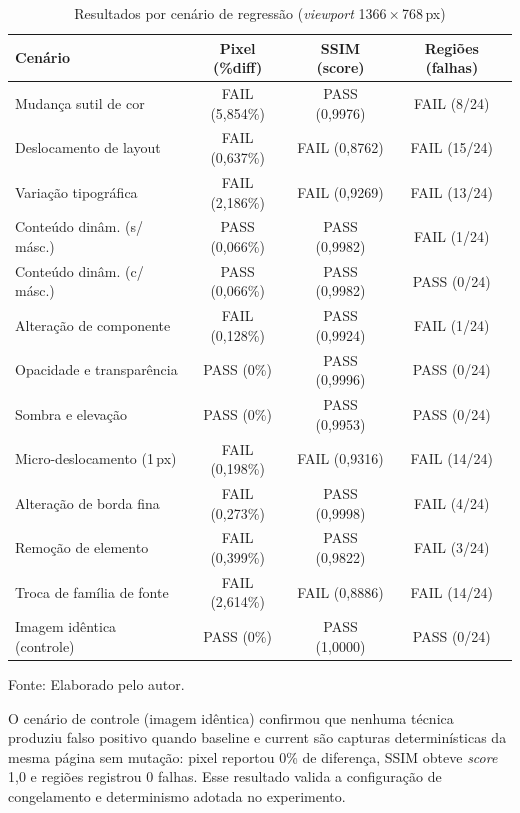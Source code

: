 \documentclass{UNESC}
\begin{document}
\begin{table}[H]
\centering
\caption{Resultados por cenário de regressão (\emph{viewport} 1366\,$\times$\,768\,px)}
\label{tab:cenarios}
\small
\setlength{\tabcolsep}{5pt}
\renewcommand{\arraystretch}{1.2}
\begin{tabular}{|l|c|c|c|}
\hline
\textbf{Cenário} & \textbf{Pixel (\%diff)} & \textbf{SSIM (score)} & \textbf{Regiões (falhas)} \\
\hline
Mudança sutil de cor       & FAIL (5,854\%) & PASS (0,9976) & FAIL (8/24) \\
Deslocamento de layout     & FAIL (0,637\%) & FAIL (0,8762) & FAIL (15/24) \\
Variação tipográfica       & FAIL (2,186\%) & FAIL (0,9269) & FAIL (13/24) \\
Conteúdo dinâm. (s/ másc.) & PASS (0,066\%) & PASS (0,9982) & FAIL (1/24) \\
Conteúdo dinâm. (c/ másc.) & PASS (0,066\%) & PASS (0,9982) & PASS (0/24) \\
Alteração de componente    & FAIL (0,128\%) & PASS (0,9924) & FAIL (1/24) \\
Opacidade e transparência  & PASS (0\%)     & PASS (0,9996) & PASS (0/24) \\
Sombra e elevação          & PASS (0\%)     & PASS (0,9953) & PASS (0/24) \\
Micro-deslocamento (1\,px) & FAIL (0,198\%) & FAIL (0,9316) & FAIL (14/24) \\
Alteração de borda fina    & FAIL (0,273\%) & PASS (0,9998) & FAIL (4/24) \\
Remoção de elemento        & FAIL (0,399\%) & PASS (0,9822) & FAIL (3/24) \\
Troca de família de fonte  & FAIL (2,614\%) & FAIL (0,8886) & FAIL (14/24) \\
Imagem idêntica (controle) & PASS (0\%)     & PASS (1,0000) & PASS (0/24) \\
\hline
\end{tabular}
\vspace{-0.2cm}
\hspace{1cm}\footnotesize Fonte: Elaborado pelo autor.
\end{table}

O cenário de controle (imagem idêntica) confirmou que nenhuma técnica produziu falso positivo quando baseline e current são capturas determinísticas da mesma página sem mutação: pixel reportou 0\% de diferença, SSIM obteve \emph{score} 1,0 e regiões registrou 0 falhas. Esse resultado valida a configuração de congelamento e determinismo adotada no experimento.
\end{document}
